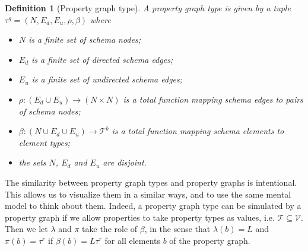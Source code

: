 \documentclass[a4paper]{article}
\newtheorem{definition}[theorem]{Definition}
\newcommand{\ptypes}{\mathcal{T}}
\newcommand{\rtype}{\tau^r}
\newcommand{\btypes}{\mathcal{T}^b}
\newcommand{\gtype}{\tau^g}
\begin{document}
\begin{definition}[Property graph type]
  A \emph{property graph type} is given by a tuple $\gtype = (N, E_d, E_u, \rho, \beta)$ where 
  \begin{itemize}
    \item $N$ is a finite set of schema nodes;
    \item $E_d$ is a finite set of directed schema edges;
    \item $E_u$ is a finite set of undirected schema edges;
    \item $\rho : (E_d \cup E_u) \to (N \times N)$ is a total function mapping schema edges to pairs of schema nodes;
    \item $\beta : (N \cup E_d \cup E_u) \to \btypes$ is a total function mapping schema elements to element types;
    \item the sets $N$, $E_d$ and $E_u$ are disjoint.
  \end{itemize}
\end{definition}

The similarity between property graph types and property graphs is intentional. This allows us to visualize them in a similar ways, and to use the same mental model to think about them. Indeed, a property graph type can be simulated by a property graph if we allow properties to take property types as values, i.e. $\ptypes \subseteq \mathcal{V}$. Then we let $\lambda$ and $\pi$ take the role of $\beta$, in the sense that $\lambda(b) = L$ and $\pi(b) = \rtype$ if $\beta(b) = L\rtype$ for all elements $b$ of the property graph.
\end{document}
